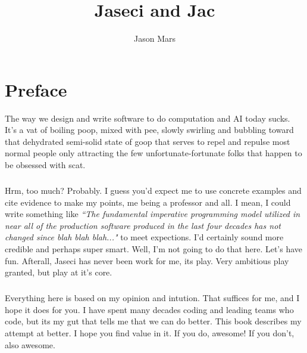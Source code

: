 \documentclass{book}
\title{Jaseci and Jac}
\author{Jason Mars}
\begin{document}

\cleardoublepage %
\setcounter{secnumdepth}{3} %
\tableofcontents
\pagebreak
\printglossary[title=Terms Used, toctitle=List of Terms]
\printglossary[type=technical, title=Technical Terms Used, toctitle=List of Technical Terms]


\chapter*{Preface}

The way we design and write software to do computation and AI today sucks. It's a vat of boiling poop, mixed with pee, slowly swirling and bubbling toward that dehydrated semi-solid state of goop that serves to repel and repulse most normal people only attracting the few unfortunate-fortunate folks that happen to be obsessed with \gls{scat}.
\paragraph{}
Hrm, too much? Probably. I guess you'd expect me to use concrete examples and cite evidence to make my points, me being a professor and all. I mean, I could write something like \textit{``The fundamental imperative programming model utilized in near all of the production software produced in the last four decades has not changed since blah blah blah..."} to meet expections. I'd certainly sound more credible and perhaps super smart. Well, I'm not going to do that here. Let's have fun. Afterall, Jaseci has never been work for me, its play. Very ambitious play granted, but play at it's core.
\paragraph{}
Everything here is based on my opinion and intution. That suffices for me, and I hope it does for you. I have spent many decades coding and leading teams who code, but its my gut that tells me that we can do better. This book describes my attempt at better. I hope you find value in it. If you do, awesome! If you don't, also awesome.
\end{document}
